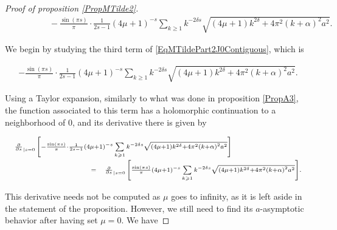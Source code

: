 \documentclass{jams-l}
\theoremstyle{definition}
\theoremstyle{remark}
\numberwithin{equation}{section}
\begin{document}
\begin{proof}[Proof of proposition \ref{PropMTilde2}]
\begin{equation}
\begin{array}{ll}
                                & \scriptstyle \qquad \qquad - \frac{\sin \left( \pi s \right)}{\pi} \cdot \frac{1}{2s-1} \left( 4 \mu + 1 \right)^{-s} \sum\limits_{k \geqslant 1} k^{-2 \delta s} \sqrt{\left( 4 \mu + 1 \right) k^{2 \delta} + 4 \pi^2 \left( k + \alpha \right)^2 a^2}.
                            \end{array}
                        \end{equation}
                        
                        \noindent We begin by studying the third term of \eqref{EqMTildePart2J0Contiguous}, which is
                        
                        \[ \begin{array}{c}
                                - \frac{\sin \left( \pi s \right)}{\pi} \cdot \frac{1}{2s-1} \left( 4 \mu + 1 \right)^{-s} \sum\limits_{k \geqslant 1} k^{-2 \delta s} \sqrt{\left( 4 \mu + 1 \right) k^{2 \delta} + 4 \pi^2 \left( k + \alpha \right)^2 a^2}.
                            \end{array} \]
                        
                        \noindent Using a Taylor expansion, similarly to what was done in proposition \ref{PropA3}, the function associated to this term has a holomorphic continuation to a neighborhood of $0$, and its derivative there is given by
                        
                        \[ \begin{array}{lll}
                                \multicolumn{3}{l}{\scriptstyle \frac{\partial}{\partial s}_{\left \vert s = 0 \right.} \left[ - \frac{\sin \left( \pi s \right)}{\pi} \cdot \frac{1}{2s-1} \left( 4 \mu + 1 \right)^{-s} \sum\limits_{k \geqslant 1} k^{-2 \delta s} \sqrt{\left( 4 \mu + 1 \right) k^{2 \delta} + 4 \pi^2 \left( k + \alpha \right)^2 a^2} \right]} \\[1em]
                                
                                \qquad \qquad \qquad \qquad & \scriptstyle = & \scriptstyle \frac{\partial}{\partial s}_{\left \vert s = 0 \right.} \left[ \frac{\sin \left( \pi s \right)}{\pi} \left( 4 \mu + 1 \right)^{-s} \sum\limits_{k \geqslant 1} k^{-2 \delta s} \sqrt{\left( 4 \mu + 1 \right) k^{2 \delta} + 4 \pi^2 \left( k + \alpha \right)^2 a^2} \right].
                            \end{array} \]
                        
                        \noindent This derivative needs not be computed as $\mu$ goes to infinity, as it is left aside in the statement of the proposition. However, we still need to find its $a$-asymptotic behavior after having set $\mu = 0$. We have
                        

\end{proof}
\end{document}
